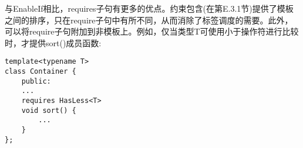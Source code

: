 与EnableIf相比，requires子句有更多的优点。约束包含(在第E.3.1节)提供了模板之间的排序，只在require子句中有所不同，从而消除了标签调度的需要。此外，可以将require子句附加到非模板上。例如，仅当类型T可使用小于操作符进行比较时，才提供sort()成员函数:

\begin{lstlisting}[style=styleCXX]
template<typename T>
class Container {
	public:
	...
	requires HasLess<T>
	void sort() {
		...
	}
};
\end{lstlisting}





